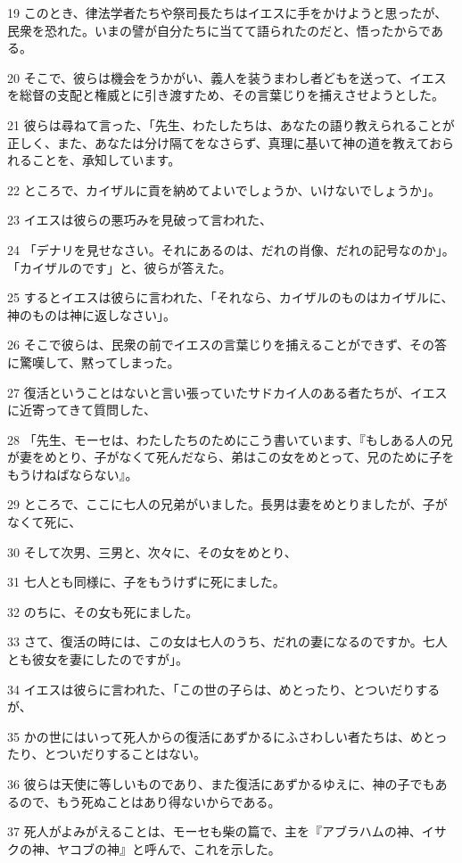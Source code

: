 \par 19 このとき、律法学者たちや祭司長たちはイエスに手をかけようと思ったが、民衆を恐れた。いまの譬が自分たちに当てて語られたのだと、悟ったからである。
\par 20 そこで、彼らは機会をうかがい、義人を装うまわし者どもを送って、イエスを総督の支配と権威とに引き渡すため、その言葉じりを捕えさせようとした。
\par 21 彼らは尋ねて言った、「先生、わたしたちは、あなたの語り教えられることが正しく、また、あなたは分け隔てをなさらず、真理に基いて神の道を教えておられることを、承知しています。
\par 22 ところで、カイザルに貢を納めてよいでしょうか、いけないでしょうか」。
\par 23 イエスは彼らの悪巧みを見破って言われた、
\par 24 「デナリを見せなさい。それにあるのは、だれの肖像、だれの記号なのか」。「カイザルのです」と、彼らが答えた。
\par 25 するとイエスは彼らに言われた、「それなら、カイザルのものはカイザルに、神のものは神に返しなさい」。
\par 26 そこで彼らは、民衆の前でイエスの言葉じりを捕えることができず、その答に驚嘆して、黙ってしまった。
\par 27 復活ということはないと言い張っていたサドカイ人のある者たちが、イエスに近寄ってきて質問した、
\par 28 「先生、モーセは、わたしたちのためにこう書いています、『もしある人の兄が妻をめとり、子がなくて死んだなら、弟はこの女をめとって、兄のために子をもうけねばならない』。
\par 29 ところで、ここに七人の兄弟がいました。長男は妻をめとりましたが、子がなくて死に、
\par 30 そして次男、三男と、次々に、その女をめとり、
\par 31 七人とも同様に、子をもうけずに死にました。
\par 32 のちに、その女も死にました。
\par 33 さて、復活の時には、この女は七人のうち、だれの妻になるのですか。七人とも彼女を妻にしたのですが」。
\par 34 イエスは彼らに言われた、「この世の子らは、めとったり、とついだりするが、
\par 35 かの世にはいって死人からの復活にあずかるにふさわしい者たちは、めとったり、とついだりすることはない。
\par 36 彼らは天使に等しいものであり、また復活にあずかるゆえに、神の子でもあるので、もう死ぬことはあり得ないからである。
\par 37 死人がよみがえることは、モーセも柴の篇で、主を『アブラハムの神、イサクの神、ヤコブの神』と呼んで、これを示した。
